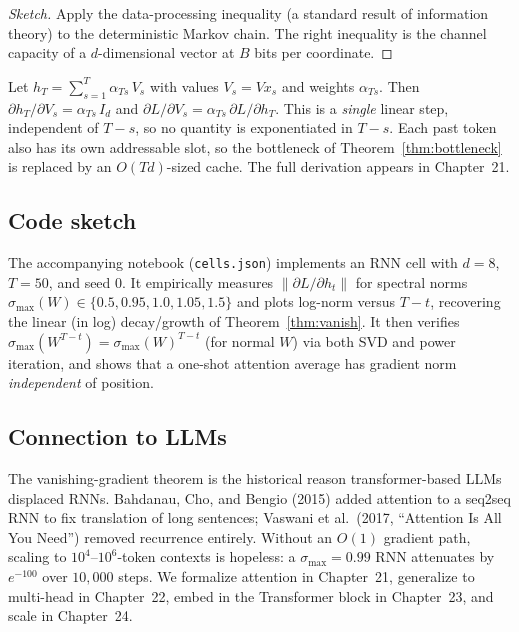 \begin{proof}[Sketch]
Apply the data-processing inequality (a standard result of information
theory) to the deterministic Markov chain. The right inequality is
the channel capacity of a $d$-dimensional vector at $B$ bits per
coordinate.
\end{proof}

\begin{proposition}
\label{prop:attention}
Let $h_T = \sum_{s=1}^T \alpha_{Ts}\,V_s$ with values $V_s = V x_s$ and
weights $\alpha_{Ts}$. Then $\partial h_T / \partial V_s = \alpha_{Ts}\,I_d$
and $\partial L / \partial V_s = \alpha_{Ts}\,\partial L/\partial h_T$.
This is a \emph{single} linear step, independent of $T - s$, so no
quantity is exponentiated in $T - s$. Each past token also has its own
addressable slot, so the bottleneck of Theorem~\ref{thm:bottleneck} is
replaced by an $O(Td)$-sized cache. The full derivation appears in
Chapter~21.
\end{proposition}

\subsection*{Code sketch}

The accompanying notebook (\texttt{cells.json}) implements an RNN cell
with $d = 8$, $T = 50$, and seed $0$. It empirically measures
$\|\partial L / \partial h_t\|$ for spectral norms
$\sigma_{\max}(W) \in \{0.5, 0.95, 1.0, 1.05, 1.5\}$ and plots
log-norm versus $T - t$, recovering the linear (in log) decay/growth of
Theorem~\ref{thm:vanish}. It then verifies
$\sigma_{\max}(W^{T-t}) = \sigma_{\max}(W)^{T-t}$ (for normal $W$) via
both SVD and power iteration, and shows that a one-shot attention
average has gradient norm \emph{independent} of position.

\subsection*{Connection to LLMs}

The vanishing-gradient theorem is the historical reason transformer-based
LLMs displaced RNNs. Bahdanau, Cho, and Bengio (2015) added attention
to a seq2seq RNN to fix translation of long sentences; Vaswani et al.\
(2017, ``Attention Is All You Need'') removed recurrence entirely.
Without an $O(1)$ gradient path, scaling to $10^4$--$10^6$-token
contexts is hopeless: a $\sigma_{\max} = 0.99$ RNN attenuates by
$e^{-100}$ over $10{,}000$ steps. We formalize attention in Chapter~21,
generalize to multi-head in Chapter~22, embed in the Transformer block
in Chapter~23, and scale in Chapter~24.
